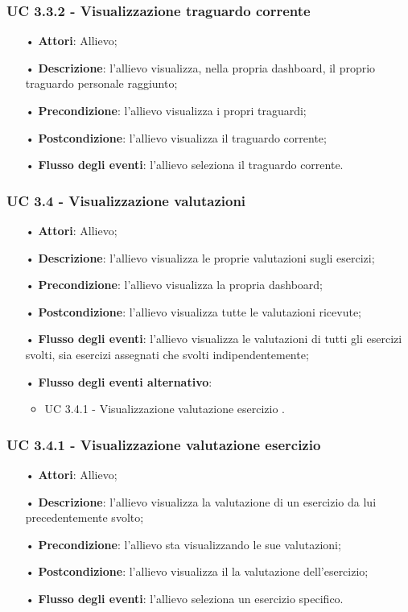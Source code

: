 \subsubsection{UC 3.3.2 - Visualizzazione traguardo corrente}
\begin{itemize}
\item[•]\textbf{Attori}: Allievo;
\item[•] \textbf{Descrizione}: l'allievo visualizza, nella propria dashboard, il proprio traguardo personale raggiunto;
\item[•] \textbf{Precondizione}: l'allievo visualizza i propri traguardi;
\item[•] \textbf{Postcondizione}: l'allievo visualizza il traguardo corrente;
\item[•] \textbf{Flusso degli eventi}: l'allievo seleziona il traguardo corrente.
\end{itemize}


\subsubsection{UC 3.4 - Visualizzazione valutazioni}
\begin{itemize}
\item[•]\textbf{Attori}: Allievo;
\item[•]\textbf{Descrizione}: l'allievo visualizza le proprie valutazioni sugli esercizi;
\item[•]\textbf{Precondizione}: l'allievo visualizza la propria dashboard;
\item[•]\textbf{Postcondizione}: l'allievo visualizza tutte le valutazioni ricevute;
\item[•]\textbf{Flusso degli eventi}: l'allievo visualizza le valutazioni di tutti gli esercizi svolti, sia esercizi assegnati che svolti indipendentemente;
\item[•] \textbf{Flusso degli eventi alternativo}: 
	\begin{itemize}
		\item UC 3.4.1 - Visualizzazione valutazione esercizio		.
	\end{itemize}
\end{itemize}

\subsubsection{UC 3.4.1 - Visualizzazione valutazione esercizio}
\begin{itemize}
\item[•]\textbf{Attori}: Allievo;
\item[•]\textbf{Descrizione}: l'allievo visualizza la valutazione di un esercizio da lui precedentemente svolto;
\item[•]\textbf{Precondizione}: l'allievo sta visualizzando le sue valutazioni;
\item[•]\textbf{Postcondizione}: l'allievo visualizza il la valutazione dell'esercizio;
\item[•]\textbf{Flusso degli eventi}: l'allievo seleziona un esercizio specifico.
\end{itemize}

